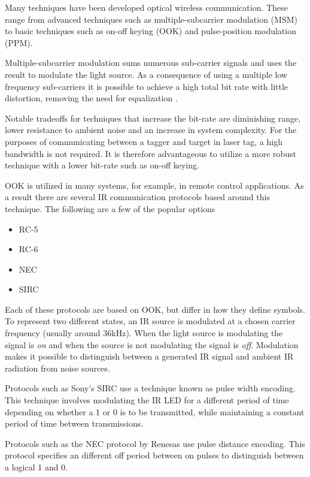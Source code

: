 Many techniques have been developed optical wireless communication. These range from advanced techniques such as multiple-subcarrier modulation (MSM) to basic techniques such as on-off keying (OOK) and pulse-position modulation (PPM).

Multiple-subcarrier modulation sums numerous sub-carrier signals and uses the result to modulate the light source. As a consequence of using a multiple low frequency sub-carriers it is possible to achieve a high total bit rate with little distortion, removing the need for equalization \cite{Ohtsuki2003}.

Notable tradeoffs for techniques that increase the bit-rate are diminishing range, lower resistance to ambient noise and an increase in system complexity. For the purposes of communicating between a tagger and target in laser tag, a high bandwidth is not required. It is therefore advantageous to utilize a more robust technique with a lower bit-rate such as on-off keying.

OOK is utilized in many systems, for example, in remote control applications. As a result there are several IR communication protocols based around this technique. The following are a few of the popular options

\begin{itemize}
	\item RC-5
	\item RC-6
	\item NEC
	\item SIRC
\end{itemize}

Each of these protocols are based on OOK, but differ in how they define symbols. To represent two different states, an IR source is modulated at a chosen carrier frequency (usually around 36kHz). When the light source is modulating the signal is \textit{on} and when the source is not modulating the signal is \textit{off}.  Modulation makes it possible to distinguish between a generated IR signal and ambient IR radiation from noise sources.

Protocols such as Sony's SIRC use a technique known as pulse width encoding. This technique involves modulating the IR LED for a different period of time depending on whether a 1 or 0 is to be transmitted, while maintaining a constant period of time between transmissions.

Protocols such as the NEC protocol by Renesas use pulse distance encoding. This protocol specifies an different off period between on pulses to distinguish between a logical 1 and 0.

